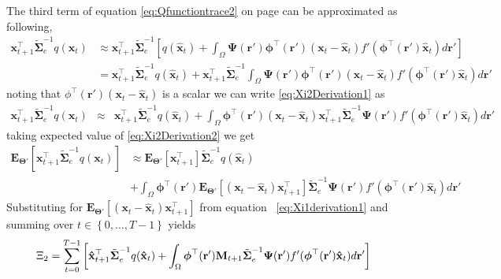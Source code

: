 \documentclass[]{article}
\begin{document}
The third term of equation \ref{eq:Qfunctiontrace2} on page \pageref{eq:Qfunctiontrace2} can be approximated as following, 
\begin{align}\label{eq:Xi2Derivation1}
 \mathbf x_{t+1}^\top\tilde{\boldsymbol\Sigma}_e^{-1}q( \mathbf x_t) &\approx  \mathbf x_{t+1}^\top\tilde{\boldsymbol\Sigma}_e^{-1}\left[q(\mathbf {\hat x}_t)+\int_\Omega \boldsymbol{\Psi}(\mathbf{r}')\boldsymbol \phi^\top(\mathbf r') (\mathbf x_t - \mathbf  {\hat x}_t)f'(\boldsymbol \phi^\top(\mathbf r')\mathbf {\hat x}_t) d\mathbf{r}'\right] \nonumber \\
&=\mathbf x_{t+1}^\top\tilde{\boldsymbol\Sigma}_e^{-1}q(\mathbf {\hat x}_t)+\mathbf x_{t+1}^\top\tilde{\boldsymbol\Sigma}_e^{-1}\int_\Omega \boldsymbol{\Psi}(\mathbf{r}')\boldsymbol \phi^\top(\mathbf r') (\mathbf x_t - \mathbf  {\hat x}_t)f'(\boldsymbol \phi^\top(\mathbf r')\mathbf {\hat x}_t) d\mathbf{r}'
\end{align}
noting that $\phi^\top(\mathbf r') (\mathbf x_t - \mathbf  {\hat x}_t)$ is a scalar we can write \ref{eq:Xi2Derivation1} as 
\begin{eqnarray}\label{eq:Xi2Derivation2}
 \mathbf x_{t+1}^\top\tilde{\boldsymbol\Sigma}_e^{-1}q( \mathbf x_t) &\approx& \mathbf x_{t+1}^\top\tilde{\boldsymbol\Sigma}_e^{-1}q(\mathbf {\hat x}_t)+\int_\Omega \boldsymbol \phi^\top(\mathbf r') (\mathbf x_t - \mathbf  {\hat x}_t)\mathbf x_{t+1}^\top\tilde{\boldsymbol\Sigma}_e^{-1}    \boldsymbol{\Psi}(\mathbf{r}')f'(\boldsymbol \phi^\top(\mathbf r')\mathbf {\hat x}_t) d\mathbf{r}'
\end{eqnarray}
taking expected value of \ref{eq:Xi2Derivation2} we get 
\begin{align}\label{eq:Xi2Derivation3}
 \mathbf E_{\boldsymbol\Theta'}\left[\mathbf x_{t+1}^\top\tilde{\boldsymbol\Sigma}_e^{-1}q( \mathbf x_t)\right] &\approx \mathbf E_{\boldsymbol\Theta'}\left[\mathbf x_{t+1}^\top\right]\tilde{\boldsymbol\Sigma}_e^{-1}q(\mathbf {\hat x}_t) \nonumber \\
&+\int_\Omega \boldsymbol \phi^\top(\mathbf r')  \mathbf E_{\boldsymbol\Theta'}\left[(\mathbf x_t - \mathbf  {\hat x}_t)\mathbf x_{t+1}^\top\right]\tilde{\boldsymbol\Sigma}_e^{-1}    \boldsymbol{\Psi}(\mathbf{r}')f'(\boldsymbol \phi^\top(\mathbf r')\mathbf {\hat x}_t) d\mathbf{r}' 
\end{align}
Substituting for  $\mathbf E_{\boldsymbol\Theta'}\left[(\mathbf x_t - \mathbf  {\hat x}_t)\mathbf x_{t+1}^\top\right]$ from equation ~\ref{eq:Xi1derivation1} and summing over $t \in \left\lbrace 0, \dots, T-1\right\rbrace $ yields
\begin{equation}
\Xi_2=\sum_{t=0}^{T-1}\left[ \mathbf{\hat x}_{t+1}^\top\tilde{\boldsymbol\Sigma}_e^{-1}q(\mathbf{\hat x}_t)+\int_\Omega\boldsymbol \phi^\top(\mathbf r') \mathbf M_{t+1} \tilde{\boldsymbol\Sigma}_e^{-1}  \boldsymbol{\Psi}(\mathbf{r}') f'(\boldsymbol \phi^\top(\mathbf r')\mathbf {\hat x}_t) d\mathbf{r}'\right] \\	
\end{equation}
\end{document}
